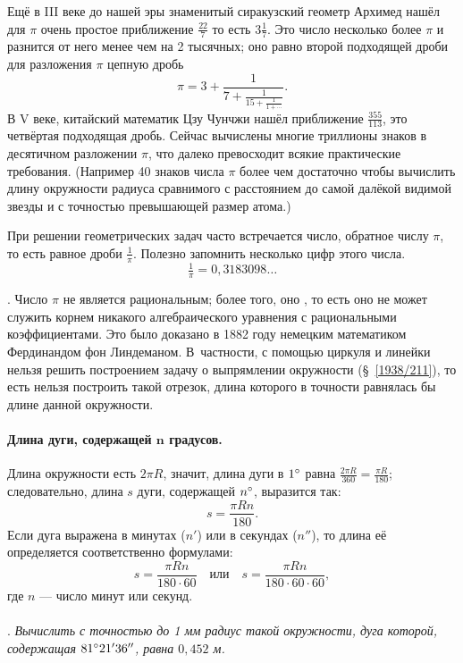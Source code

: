 Ещё в III веке до нашей эры знаменитый сиракузский геометр Архимед нашёл для $\pi$ очень простое приближение $\tfrac{22}7$ то есть $3\tfrac17$.
Это число несколько более $\pi$ и разнится от него менее чем на 2 тысячных;
оно равно второй подходящей дроби для разложения $\pi$ цепную дробь
\[\pi=3+\frac{1}{7+\frac{1}{15+\frac{1}{1+\cdots}}}.\]
В V веке, китайский математик Цзу Чунчжи нашёл приближение $\tfrac{355}{113}$, это четвёртая подходящая дробь. 
Сейчас вычислены многие триллионы знаков в десятичном разложении $\pi$, что далеко превосходит всякие практические требования.
(Например 40 знаков числа $\pi$ более чем достаточно чтобы вычислить длину окружности радиуса сравнимого с расстоянием до самой далёкой видимой звезды и с точностью превышающей размер атома.) 

При решении геометрических задач часто встречается число, обратное числу $\pi$, то есть равное дроби $\tfrac1\pi$.
Полезно запомнить несколько цифр этого числа.
\[\tfrac1\pi = 0{,}3183098\dots\]

{\small
\sloppy

\smallskip
{}.
Число $\pi$ не является рациональным;
более того, оно , то есть оно не может служить корнем никакого алгебраического уравнения с рациональными коэффициентами.
Это было доказано в 1882 году немецким математиком Фердинандом фон Линдеманом.
В~частности, с помощью циркуля и линейки нельзя решить построением задачу о выпрямлении окружности (§~\ref{1938/211}), то есть нельзя построить такой отрезок, длина которого в точности равнялась бы длине данной окружности.

}

\paragraph{Длина дуги, содержащей $\bm{n}$ градусов.}\label{1938/239}
Длина окружности есть $2\pi R$, значит, длина дуги в $1\degree$ равна $\frac{2\pi R}{360}=\frac{\pi R}{180}$; следовательно, длина $s$ дуги, содержащей $n\degree$, выразится так:
\[s=\frac{\pi R n}{180}.\]
Если дуга выражена в минутах ($n'$) или в секундах ($n''$), то длина её определяется соответственно формулами:
\[s=\frac{\pi R n}{180\cdot 60}
\quad\text{или}\quad
s=\frac{\pi R n}{180\cdot 60\cdot 60},\]
где $n$ — число минут или секунд.

\paragraph{}\label{1938/240}
.
\emph{Вычислить с точностью до 1 мм радиус такой окружности, дуга которой, содержащая $81\degree 21'36''$, равна $0{,}452$ м.}

